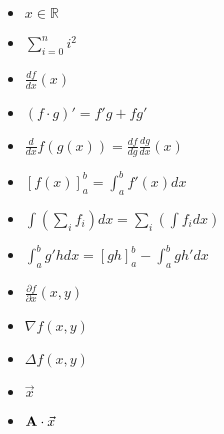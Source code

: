 \documentclass[a4paper,12pt]{article}
\begin{document}
\head{}{}{}
 
\begin{task}{}
\begin{itemize}
 \item $x \in \mathbb{R}$
 \item $\sum_{i=0}^{n} i^2$
 \item $\frac{d f}{d x} (x)$
 \item $\left(f \cdot g\right)' = f' g + f g'$
 \item $\frac{d}{d x}f(g(x))=\frac{d f}{d g} \frac{dg}{dx}(x)$
 \item $[f(x)]_a^b = \int_a^b f'(x) dx$
 \item $\int\left(\sum_i f_i\right)dx = \sum_i\left(\int f_i dx\right)$
 \item $\int_a^b g' h dx=[g h]_a^b - \int_a^b g h' dx$
 \item $\frac{\partial f}{\partial x} (x,y)$
 \item $\nabla f (x,y)$
 \item $\Delta f (x,y)$
 \item $\vec{x}$
 \item ${\bf A} \cdot \vec{x}$
\end{itemize}


\end{task}
\end{document}
